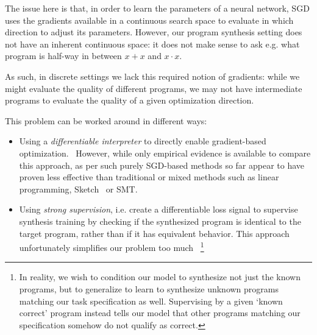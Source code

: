 \documentclass{article}
\begin{document}
The issue here is that, in order to learn the parameters of a neural network, SGD uses the gradients available in a continuous search space to evaluate in which direction to adjust its parameters.
However, our program synthesis setting does not have an inherent continuous space:
it does not make sense to ask e.g. what program is half-way in between $x+x$ and $x \cdot x$.

As such, in discrete settings we lack this required notion of gradients:
while we might evaluate the quality of different programs,
we may not have intermediate programs to evaluate the quality of a given optimization direction.

This problem can be worked around in different ways:
\begin{itemize}
    \item Using a \emph{differentiable interpreter} to directly enable gradient-based optimization.~\citep{forth,terpret,houdini,feser2016differentiable,rocktaschel2017end,abadi2019simple}
        However, while only empirical evidence is available to compare this approach, as per \citet{terpret} such purely SGD-based methods so far appear to have proven less effective than traditional or mixed methods such as linear programming, Sketch~\citep{solar2008program} or SMT.
    \item Using \emph{strong supervision}, i.e. create a differentiable loss signal
        to supervise synthesis training by checking if the synthesized program is identical to the target program,
        rather than if it has equivalent behavior.
        This approach unfortunately simplifies our problem too much%
        ~\footnote{
            In reality, we wish to condition our model to synthesize not just the known programs,
            but to generalize to learn to synthesize unknown programs matching our task specification as well.
            Supervising by a given `known correct' program instead tells our model that other programs matching our specification somehow do not qualify as correct.

}
\end{itemize}
\end{document}
